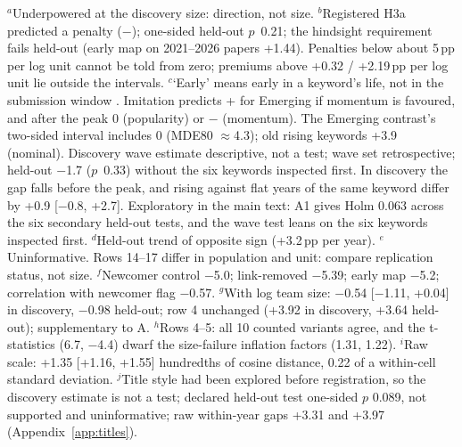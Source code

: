 \begin{table}[p]
\vspace{2pt}
\parbox{\textwidth}{\scriptsize\raggedright
$^a$Underpowered at the discovery size: direction, not size.
$^b$Registered H3a predicted a penalty ($-$); one-sided held-out $p$~0.21; the hindsight requirement fails held-out (early map on
2021--2026 papers +1.44). Penalties
below about 5\,pp per log unit cannot be told from zero; premiums above +0.32 / +2.19\,pp per log unit lie outside
the intervals.
$^c$`Early' means early in a keyword's life, not in the submission window \citep[cf.][]{jung2025what}. Imitation
predicts + for Emerging if momentum is favoured, and after the peak 0 (popularity) or $-$ (momentum). The Emerging
contrast's two-sided interval includes 0 (MDE80 $\approx$4.3); old rising keywords +3.9 (nominal).
Discovery wave estimate descriptive, not a test; wave set retrospective; held-out $-$1.7 ($p$~0.33) without the six
keywords inspected first. In discovery the gap falls before the peak, and rising against flat years of the same
keyword differ by +0.9 [$-$0.8, +2.7]. Exploratory in the main text: A1 gives Holm 0.063 across the six secondary
held-out tests, and the wave test leans on the six keywords inspected first.
$^d$Held-out trend of opposite sign (+3.2\,pp per year).
$^e$Uninformative. Rows 14--17 differ in population and unit: compare replication status, not size.
$^f$Newcomer control $-$5.0; link-removed $-$5.39; early map $-$5.2; correlation with newcomer flag $-$0.57.
$^g$With log team size: $-$0.54 [$-$1.11, +0.04] in discovery, $-$0.98 held-out; row 4 unchanged (+3.92 in discovery,
+3.64 held-out); supplementary to A.
$^h$Rows 4--5: all 10 counted variants agree, and the t-statistics (6.7, $-$4.4) dwarf the size-failure inflation
factors (1.31, 1.22).
$^i$Raw scale: +1.35 [+1.16, +1.55] hundredths of cosine distance, 0.22 of a within-cell standard deviation.
$^j$Title style had been explored before registration, so the discovery estimate is not a test; declared held-out
test one-sided $p$ 0.089, not supported and uninformative; raw within-year gaps +3.31 and +3.97
(Appendix~\ref{app:titles}).}
\caption{The herding account tested at three points, in full: each observable, its internal code and the sign
predicted by imitation and by continuity (in parentheses: its mechanism or reference point, or a named alternative:
lock-in, priority; $\cdot$: none). Percentage points unless the row states otherwise (row 1: counts; row 3: twins per
paper per 1,000 submissions; row 6: percentile points; row 11: slope $b$), 95\% intervals, within topic and year
(keyword rows and row 11: against the same year's other papers). Held-out tests are one-sided and confirm direction,
}
\end{table}
